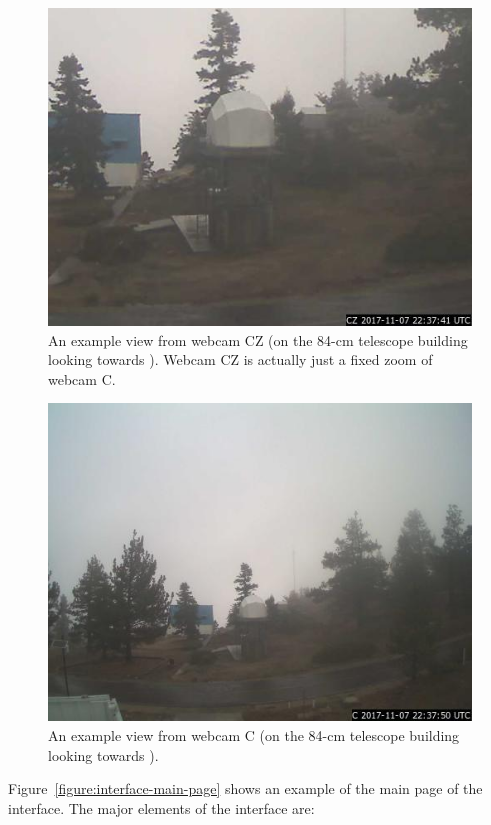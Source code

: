 \begin{figure}
\begin{center}
\includegraphics[width=0.8\linewidth]{figures/interface-ddotioan-webcam-cz.jpg}
\end{center}
\caption{An example view from webcam CZ (on the 84-cm telescope building looking towards {\projectname}). Webcam CZ is actually just a fixed zoom of webcam C.}
\label{figure:interface-webcam-cz}
\end{figure}

\begin{figure}
\begin{center}
\includegraphics[width=0.8\linewidth]{figures/interface-ddotioan-webcam-c.jpg}
\end{center}
\caption{An example view from webcam C (on the 84-cm telescope building looking towards {\projectname}).}
\label{figure:interface-webcam-c}
\end{figure}

\fi

Figure~\ref{figure:interface-main-page} shows an example of the main page of the interface. The major elements of the interface are:

